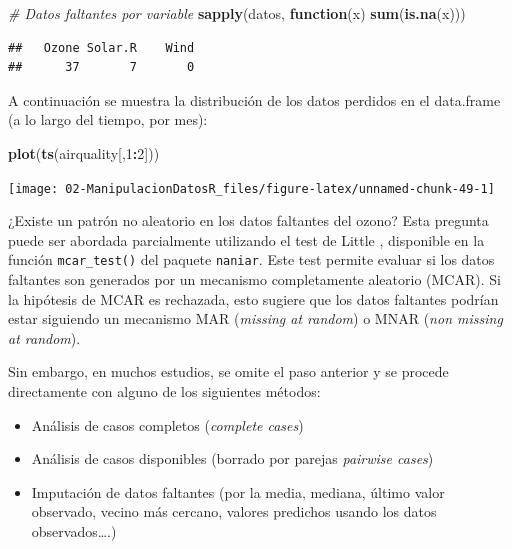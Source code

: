 \documentclass[
]{book}
\newenvironment{Shaded}{\begin{snugshade}}{\end{snugshade}}
\newcommand{\CommentTok}[1]{\textcolor[rgb]{0.56,0.35,0.01}{\textit{#1}}}
\newcommand{\ControlFlowTok}[1]{\textcolor[rgb]{0.13,0.29,0.53}{\textbf{#1}}}
\newcommand{\DecValTok}[1]{\textcolor[rgb]{0.00,0.00,0.81}{#1}}
\newcommand{\FunctionTok}[1]{\textcolor[rgb]{0.13,0.29,0.53}{\textbf{#1}}}
\newcommand{\NormalTok}[1]{#1}
\newcommand{\SpecialCharTok}[1]{\textcolor[rgb]{0.81,0.36,0.00}{\textbf{#1}}}
\providecommand{\tightlist}{%
  \setlength{\itemsep}{0pt}\setlength{\parskip}{0pt}}
\begin{document}
\begin{Shaded}
\begin{Highlighting}[]
\CommentTok{\# Datos faltantes por variable}
\FunctionTok{sapply}\NormalTok{(datos, }\ControlFlowTok{function}\NormalTok{(x) }\FunctionTok{sum}\NormalTok{(}\FunctionTok{is.na}\NormalTok{(x)))}
\end{Highlighting}
\end{Shaded}

\begin{verbatim}
##   Ozone Solar.R    Wind 
##      37       7       0
\end{verbatim}

A continuación se muestra la distribución de los datos perdidos en el data.frame (a lo largo del tiempo, por mes):

\begin{Shaded}
\begin{Highlighting}[]
\FunctionTok{plot}\NormalTok{(}\FunctionTok{ts}\NormalTok{(airquality[,}\DecValTok{1}\SpecialCharTok{:}\DecValTok{2}\NormalTok{]))}
\end{Highlighting}
\end{Shaded}

\begin{center}\texttt{[image: 02-ManipulacionDatosR\_files/figure-latex/unnamed-chunk-49-1]} \end{center}

¿Existe un patrón no aleatorio en los datos faltantes del ozono? Esta pregunta puede ser abordada parcialmente utilizando el test de Little \citep{little1998}, disponible en la función \texttt{mcar\_test()} del paquete \texttt{naniar}. Este test permite evaluar si los datos faltantes son generados por un mecanismo completamente aleatorio (MCAR). Si la hipótesis de MCAR es rechazada, esto sugiere que los datos faltantes podrían estar siguiendo un mecanismo MAR (\emph{missing at random}) o MNAR (\emph{non missing at random}).

Sin embargo, en muchos estudios, se omite el paso anterior y se procede directamente con alguno de los siguientes métodos:

\begin{itemize}
\tightlist
\item
  Análisis de casos completos (\emph{complete cases})
\item
  Análisis de casos disponibles (borrado por parejas \emph{pairwise cases})
\item
  Imputación de datos faltantes (por la media, mediana, último valor observado, vecino más cercano, valores predichos usando los datos observados\ldots.)
\end{itemize}
\end{document}
